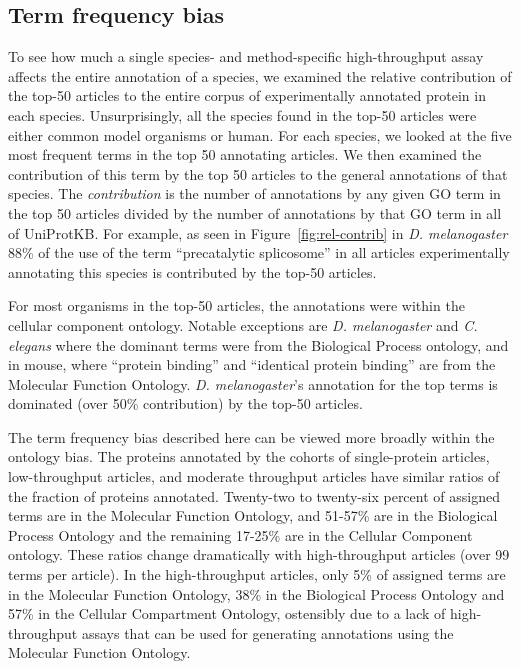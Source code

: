 \documentclass[12pt]{article}
\begin{document}
\subsection*{Term frequency bias}

To see how much a single species- and method-specific high-throughput assay affects
the entire annotation of a species, we examined the relative contribution of the
top-50 articles to the entire corpus of experimentally annotated protein in each
species.  Unsurprisingly, all the species found in the top-50 articles were either
common model organisms or human.  For each species, we looked at the five most
frequent terms in the top 50 annotating articles. We then examined the contribution
of this term by the top 50 articles to the general annotations of that species.  The
\textit{contribution} is the number of annotations by any given GO term in the top
50 articles divided by the number of annotations by that GO term in all of
UniProtKB.  For example, as seen in Figure~\ref{fig:rel-contrib} in \textit{D.
melanogaster} 88\% of the use of the term ``precatalytic splicosome'' in all
articles experimentally annotating this species is contributed by the top-50
articles. 


For most organisms in the top-50 articles,  the annotations were within the cellular
component ontology. Notable exceptions are \textit{D. melanogaster} and \textit{C.
elegans} where the dominant terms were from the Biological Process ontology, and in
mouse, where ``protein binding'' and ``identical protein binding'' are from the
Molecular Function Ontology.  \textit{D. melanogaster}'s annotation for the top
terms is dominated (over 50\% contribution) by the top-50 articles. 

The term frequency bias described here can be viewed more broadly within the
ontology bias. The proteins annotated by the cohorts of single-protein articles,
low-throughput articles, and moderate throughput articles have similar ratios of the
fraction of proteins annotated.  Twenty-two to twenty-six percent of assigned terms
are in the Molecular Function Ontology, and 51-57\% are in the Biological Process
Ontology and the remaining 17-25\% are in the Cellular Component ontology.  These
ratios change dramatically with high-throughput articles (over 99 terms per
article). In the high-throughput articles, only 5\% of assigned terms are in the
Molecular Function Ontology, 38\% in the Biological Process Ontology and 57\% in the
Cellular Compartment Ontology, ostensibly due to a lack of high-throughput assays
that can be used for generating annotations using the Molecular Function Ontology. 
\end{document}
